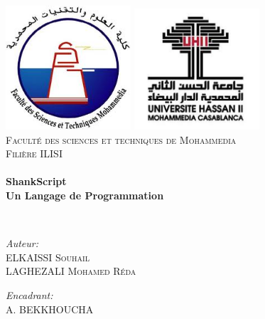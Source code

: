 \begin{titlepage}
\begin{center}

\includegraphics[width=0.35\textwidth]{./LogoFSTM.jpg}
\includegraphics[width=0.35\textwidth]{./univlogo.png}
\\[1cm]

\textsc{\LARGE Faculté des sciences et techniques de Mohammedia}\\[1.5cm]

\textsc{\Large Filière ILISI }\\[0.5cm]

\HRule \\[0.4cm]

{\huge \bfseries ShankScript\\
Un Langage de Programmation \\[0.4cm] }

\HRule \\[1.5cm]

\begin{minipage}{0.4\textwidth}
\begin{flushleft} \large
\emph{Auteur:}\\
ELKAISSI \textsc{Souhail}\\
LAGHEZALI \textsc{Mohamed Réda}\\

\end{flushleft}
\end{minipage}
\begin{minipage}{0.4\textwidth}
\begin{flushright} \large
\emph{Encadrant:} \\
A. \textsc{ BEKKHOUCHA}\\


\end{flushright}
\end{minipage}
\end{center}
\end{titlepage}
